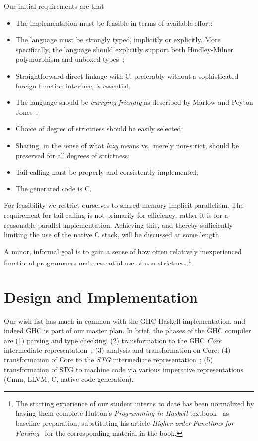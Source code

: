 \documentclass{llncs}
\begin{document}
Our initial requirements are that
%
\begin{itemize}
\item The implementation must be feasible in terms of available effort;
\item The language must be strongly typed, implicitly or explicitly.  More
  specifically, the language should explicitly support both Hindley-Milner
  polymorphism and unboxed types~\cite{Jones:1991};
\item Straightforward direct linkage with C, preferably without a sophisticated
  foreign function interface, is essential;
  \item The language should be \emph{currying-friendly} as described by Marlow
and Peyton Jones~\cite{Marlow:2004};
\item Choice of degree of strictness should be easily selected;
\item Sharing, in the sense of what \emph{lazy} means vs.\ merely non-strict,
  should be preserved for all degrees of strictness;
\item Tail calling must be properly and consistently implemented;
\item The generated code is C.
\end{itemize}
%
For feasibility we restrict ourselves to shared-memory implicit parallelism.
The requirement for tail calling is not primarily for efficiency, rather it is
for a reasonable parallel implementation.  Achieving this, and thereby
sufficiently limiting the use of the native C stack, will be discussed at some
length.

A minor, informal goal is to gain a sense of how often relatively
inexperienced functional programmers make essential use of
non-strictness.\footnote{The starting experience of our student interns to
  date has been normalized by having them complete Hutton's \emph{Programming
    in Haskell} textbook~\cite{Hutton-book} as baseline preparation,
  substituting his article \emph{Higher-order Functions for
    Parsing}~\cite{Hutton-parsing:1992} for the corresponding material in the
  book.}

\section{Design and Implementation}
Our wish list has much in common with the GHC Haskell implementation, and
indeed GHC is part of our master plan.  In brief, the phases of the GHC
compiler are (1) parsing and type checking; (2) transformation to the GHC
\emph{Core} intermediate representation~\cite{Sulzmann:2007,ghc-core}; (3)
analysis and transformation on Core; (4) transformation of Core to the
\emph{STG} intermediate representation~\cite{PJ-stockhardware}; (5)
transformation of STG to machine code via various imperative
representations (Cmm, LLVM, C, native code generation).
\end{document}
